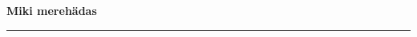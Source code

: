 \documentclass[10pt]{book}
\begin{document}
{
  \samepage
  \raggedbottom
  \raggedright
  \sloppy


  \vspace{0.2in}

  \noindent\begin{minipage}{.1\textwidth}
    \hfill\vspace{0.1in}
  \end{minipage}%
  \noindent\begin{minipage}{.8\textwidth}
    \centering
    \bfseries
    \large Miki mereh\"adas
  \end{minipage}%
  \noindent\begin{minipage}{.1\textwidth}
      \hfill\vspace{0.1in}
  \end{minipage}

  \nopagebreak[4]
  \vspace{0.1in}
  \nopagebreak[4]
  \hrule height 0.05ex
  \nopagebreak[4]
  \vspace{-0.05in}




}
\end{document}
